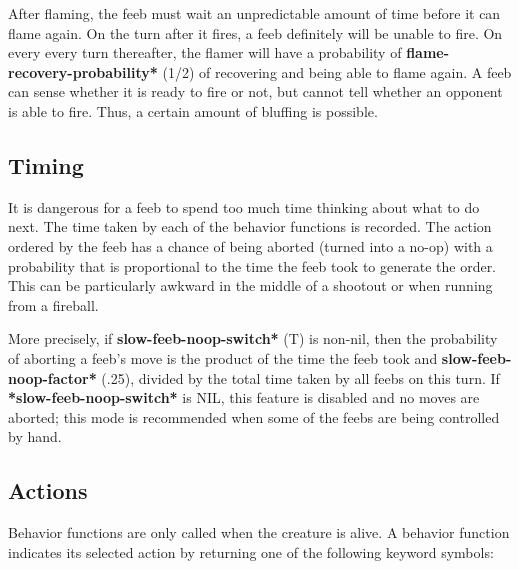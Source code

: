 \documentclass[12pt]{article}
\begin{document}
After flaming, the feeb must wait an unpredictable amount of time
before it can flame again.  On the turn after it fires, a feeb
definitely will be unable to fire.  On every every turn thereafter,
the flamer will have a probability of
{\bf *flame-recovery-probability*} (1/2) of recovering and being able
to flame again.  A feeb can sense whether it is ready to fire or not,
but cannot tell whether an opponent is able to fire.  Thus, a certain
amount of bluffing is possible.

\subsection {Timing}

It is dangerous for a feeb to spend too much time thinking about what
to do next.  The time taken by each of the behavior functions is
recorded.  The action ordered by the feeb has a chance of being
aborted (turned into a no-op) with a probability that is proportional
to the time the feeb took to generate the order.  This can be
particularly awkward in the middle of a shootout or when running from
a fireball.

More precisely, if {\bf *slow-feeb-noop-switch*} (T) is non-nil, then
the probability of aborting a feeb's move is the product of the time
the feeb took and {\bf *slow-feeb-noop-factor*} (.25), divided by the
total time taken by all feebs on this turn.  If {\bf
*slow-feeb-noop-switch*} is NIL, this feature is disabled and no moves
are aborted; this mode is recommended when some of the feebs are being
controlled by hand.

\subsection {Actions}

Behavior functions are only called when the creature is alive.
A behavior function indicates its selected action by returning one of
the following keyword symbols:
\end{document}
